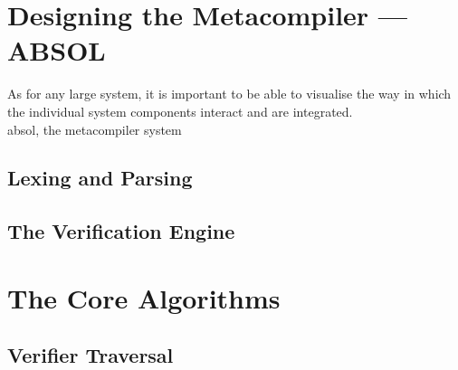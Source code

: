 

\section{Designing the Metacompiler --- ABSOL} %
\label{sec:designing_the_metacompiler_absol}

As for any large system, it is important to be able to visualise the way in which the individual system components interact and are integrated. \\

\gls{absol}, the metacompiler system 

\subsection{Lexing and Parsing} %
\label{sub:lexing_and_parsing}


\subsection{The Verification Engine} %
\label{sub:the_verification_engine}



\section{The Core Algorithms} %
\label{sec:the_core_algorithms}

\subsection{Verifier Traversal} %
\label{sub:verifier_traversal}

